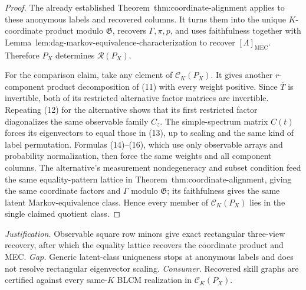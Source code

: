 \documentclass{article}
\begin{document}
\begin{proof}
The already established Theorem~\textnormal{thm:coordinate-alignment} applies to these anonymous labels and recovered columns.  It turns them into the unique \(K\)-coordinate product modulo \(\mathfrak G\), recovers \(\Gamma,\pi,p\), and uses faithfulness together with Lemma~\textnormal{lem:dag-markov-equivalence-characterization} to recover \([\Lambda]_{\mathrm{MEC}}\).  Therefore \(P_X\) determines \(\mathcal R(P_X)\).

For the comparison claim, take any element of \(\mathcal C_K(P_X)\).  It gives another \(r\)-component product decomposition of (11) with every weight positive.  Since \(\overline T\) is invertible, both of its restricted alternative factor matrices are invertible.  Repeating (12) for the alternative shows that its first restricted factor diagonalizes the same observable family \(C_z\).  The simple-spectrum matrix \(C(t)\) forces its eigenvectors to equal those in (13), up to scaling and the same kind of label permutation.  Formulas (14)--(16), which use only observable arrays and probability normalization, then force the same weights and all component columns.  The alternative's measurement nondegeneracy and subset condition feed the same equality-pattern lattice in Theorem~\textnormal{thm:coordinate-alignment}, giving the same coordinate factors and \(\Gamma\) modulo \(\mathfrak G\); its faithfulness gives the same latent Markov-equivalence class.  Hence every member of \(\mathcal C_K(P_X)\) lies in the single claimed quotient class.
\end{proof}
\par\smallskip\noindent \textit{Justification.} Observable square row minors give exact rectangular three-view recovery, after which the equality lattice recovers the coordinate product and MEC. \textit{Gap.} Generic latent-class uniqueness stops at anonymous labels and does not resolve rectangular eigenvector scaling. \textit{Consumer.} Recovered skill graphs are certified against every same-\(K\) BLCM realization in \(\mathcal C_K(P_X)\).
\end{document}
